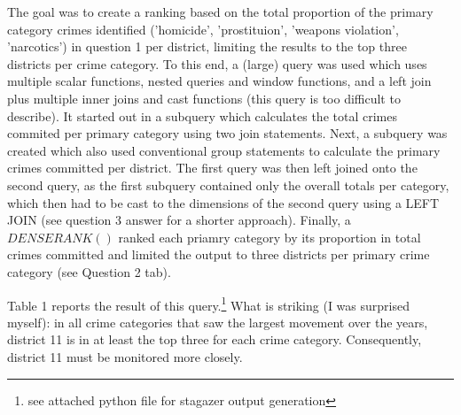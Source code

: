 \documentclass[a4paper]{article}
\begin{document}
The goal was to create a ranking based on the total proportion of the primary category crimes identified ('homicide', 'prostituion', 'weapons violation', 'narcotics') in question 1 per district, limiting the results to the top three districts per crime category. To this end, a (large) query was used which uses multiple scalar functions, nested queries and window functions, and a left join plus multiple inner joins and cast functions (this query is too difficult to describe). It started out in a subquery which calculates the total crimes commited per primary category using two join statements. Next, a subquery was created which also used conventional group statements to calculate the primary crimes committed per district. The first query was then left joined onto the second query, as the first subquery contained only the overall totals per category, which then had to be cast to the dimensions of the second query using a LEFT JOIN (see question 3 answer for a shorter approach). Finally, a $DENSE RANK()$ ranked each priamry category by its proportion in total crimes committed and limited the output to three districts per primary crime category (see Question 2 tab).

Table 1 reports the result of this query.\footnote{see attached python file for stagazer output generation} What is striking (I was surprised myself): in all crime categories that saw the largest movement over the years, district 11 is in at least the top three for each crime category. Consequently, district 11 must be monitored more closely. 
\end{document}
